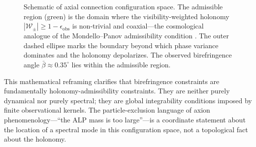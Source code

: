 \documentclass[12pt]{article}
\theoremstyle{definition}
\newcommand{\kA}{\kappa_A}
\newcommand{\Wrec}{\Delta\eta_{\mathrm{rec}}}
\newcommand{\xirec}{\xi_{\mathrm{rec}}}
\newcommand{\Wpm}{\mathcal{W}_\pm}
\begin{document}
\begin{figure}[h]
\centering
{}
\caption{Schematic of axial connection configuration space.
  The admissible region (green) is the domain where the visibility-weighted
  holonomy $|\Wpm|\geq1-\epsilon_{\mathrm{obs}}$ is non-trivial and
  coaxial---the cosmological analogue of the Mondello--Panov admissibility
  condition \cite{MondelloPanov2016}.
  The outer dashed ellipse marks the boundary beyond which phase variance
  dominates and the holonomy depolarizes.
  The observed birefringence angle $\bar\beta\approx0.35^\circ$
  \cite{MinamiKomatsu2020} lies within the admissible region.}
\label{fig:admissible_region}
\end{figure}

This mathematical reframing clarifies that birefringence constraints are fundamentally holonomy-admissibility constraints. They are neither purely dynamical nor purely spectral; they are global integrability conditions imposed by finite observational kernels. The particle-exclusion language of axion phenomenology---``the ALP mass is too large''---is a coordinate statement about the location of a spectral mode in this configuration space, not a topological fact about the holonomy.
\end{document}
